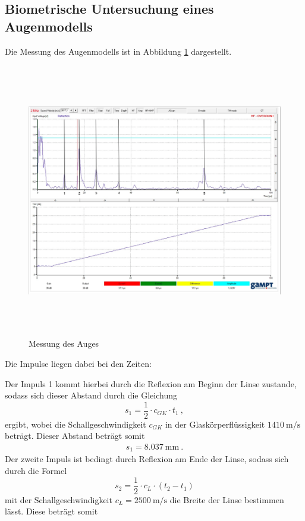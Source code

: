 \subsection{Biometrische Untersuchung eines Augenmodells}
Die Messung des Augenmodells ist in Abbildung \ref{fig:messauge} dargestellt.
\begin{figure}[H]
  \centering
  \includegraphics[height=12cm]{Auge2.png}
  \caption{Messung des Auges}
  \label{fig:messauge}
\end{figure}
Die Impulse liegen dabei bei den Zeiten:

Der Impuls 1 kommt hierbei durch die Reflexion am Beginn der Linse zustande, sodass
sich dieser Abstand durch die Gleichung
\begin{equation}
  s_1 = \frac{1}{2} \cdot c_{GK} \cdot t_1 \: ,
\end{equation}
ergibt, wobei die Schallgeschwindigkeit $c_{GK}$ in der Glaskörperflüssigkeit $\SI{1410}{\meter\per\second}$
beträgt. Dieser Abstand beträgt somit
\begin{align*}
  s_1 = \SI{8.037}{\milli\meter} \: .
\end{align*}
Der zweite Impuls ist bedingt durch Reflexion am Ende der Linse, sodass sich durch die
Formel
\begin{equation}
  s_2 = \frac{1}{2} \cdot c_L \cdot (t_2-t_1)
\end{equation}
mit der Schallgeschwindigkeit $c_L = \SI{2500}{\meter\per\second}$ die Breite der
Linse bestimmen lässt. Diese beträgt somit
